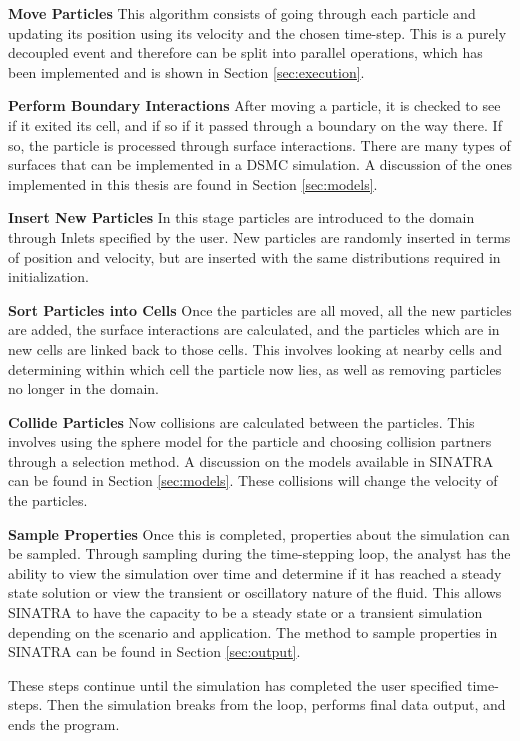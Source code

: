 \indent \textbf{Move Particles} This algorithm consists of going through each particle and updating its position using its velocity and the chosen time-step. This is a purely decoupled event and therefore can be split into parallel operations, which has been implemented and is shown in Section \ref{sec:execution}. \par

\indent \textbf{Perform Boundary Interactions} After moving a particle, it is checked to see if it exited its cell, and if so if it passed through a boundary on the way there. If so, the particle is processed through surface interactions. There are many types of surfaces that can be implemented in a DSMC simulation. A discussion of the ones implemented in this thesis are found in Section \ref{sec:models}. \par

\indent \textbf{Insert New Particles} In this stage particles are introduced to the domain through Inlets specified by the user. New particles are randomly inserted in terms of position and velocity, but are inserted with the same distributions required in initialization. \par

\indent \textbf{Sort Particles into Cells} Once the particles are all moved, all the new particles are added, the surface interactions are calculated, and the particles which are in new cells are linked back to those cells. This involves looking at nearby cells and determining within which cell the particle now lies, as well as removing particles no longer in the domain. \par

\indent \textbf{Collide Particles} Now collisions are calculated between the particles. This involves using the sphere model for the particle and choosing collision partners through a selection method. A discussion on the models available in SINATRA can be found in Section \ref{sec:models}. These collisions will change the velocity of the particles. \par

\indent \textbf{Sample Properties} Once this is completed, properties about the simulation can be sampled. Through sampling during the time-stepping loop, the analyst has the ability to view the simulation over time and determine if it has reached a steady state solution or view the transient or oscillatory nature of the fluid. This allows SINATRA to have the capacity to be a steady state or a transient simulation depending on the scenario and application. The method to sample properties in SINATRA can be found in Section \ref{sec:output}. \par

These steps continue until the simulation has completed the user specified time-steps. Then the simulation breaks from the loop, performs final data output, and ends the program. 




